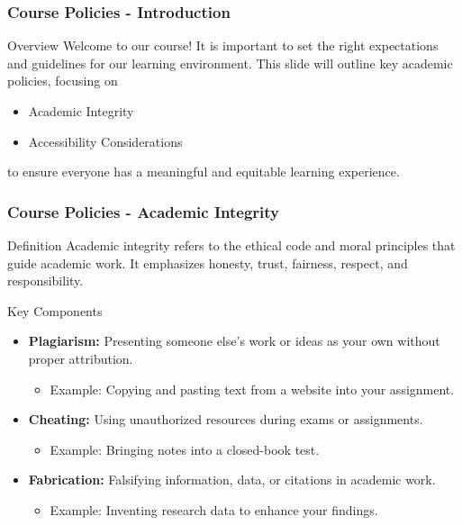 \documentclass[aspectratio=169]{beamer}
\begin{document}
\begin{frame}[fragile]
  \frametitle{Course Policies - Introduction}
  \begin{block}{Overview}
    Welcome to our course! It is important to set the right expectations and guidelines for our learning environment. This slide will outline key academic policies, focusing on 
    \begin{itemize}
      \item Academic Integrity
      \item Accessibility Considerations
    \end{itemize}
    to ensure everyone has a meaningful and equitable learning experience.
  \end{block}
\end{frame}

\begin{frame}[fragile]
  \frametitle{Course Policies - Academic Integrity}
  \begin{block}{Definition}
    Academic integrity refers to the ethical code and moral principles that guide academic work. It emphasizes honesty, trust, fairness, respect, and responsibility.
  \end{block}

  \begin{block}{Key Components}
    \begin{itemize}
      \item \textbf{Plagiarism:} Presenting someone else's work or ideas as your own without proper attribution.
      \begin{itemize}
        \item Example: Copying and pasting text from a website into your assignment.
      \end{itemize}

      \item \textbf{Cheating:} Using unauthorized resources during exams or assignments.
      \begin{itemize}
        \item Example: Bringing notes into a closed-book test.
      \end{itemize}
      
      \item \textbf{Fabrication:} Falsifying information, data, or citations in academic work.
      \begin{itemize}
        \item Example: Inventing research data to enhance your findings.
      \end{itemize}
    \end{itemize}
  \end{block}
  

\end{frame}
\end{document}
